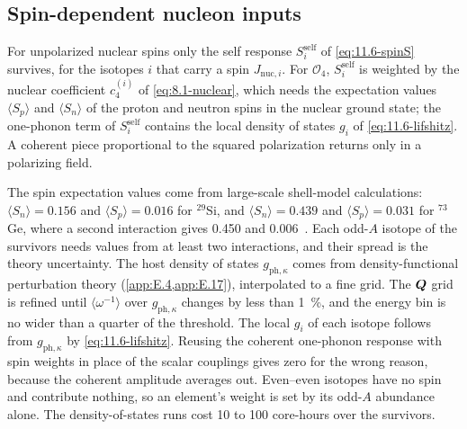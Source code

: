 \subsection{Spin-dependent nucleon inputs}

For unpolarized nuclear spins only the self response $S^{\mathrm{self}}_i$ of \cref{eq:11.6-spinS} survives, for the isotopes $i$ that carry a spin $J_{\mathrm{nuc},i}$. For $\mathcal{O}_4$, $S^{\mathrm{self}}_i$ is weighted by the nuclear coefficient $c_4^{(i)}$ of \cref{eq:8.1-nuclear}, which needs the expectation values $\langle S_p\rangle$ and $\langle S_n\rangle$ of the proton and neutron spins in the nuclear ground state; the one-phonon term of $S^{\mathrm{self}}_i$ contains the local density of states $g_i$ of \cref{eq:11.6-lifshitz}. A coherent piece proportional to the squared polarization returns only in a polarizing field.

The spin expectation values come from large-scale shell-model calculations: $\langle S_n\rangle = 0.156$ and $\langle S_p\rangle = 0.016$ for $^{29}$Si, and $\langle S_n\rangle = 0.439$ and $\langle S_p\rangle = 0.031$ for $^{73}$Ge, where a second interaction gives 0.450 and 0.006~\cite[Table~III]{klos2013large}. Each odd-$A$ isotope of the survivors needs values from at least two interactions, and their spread is the theory uncertainty. The host density of states $g_{\mathrm{ph},\kappa}$ comes from density-functional perturbation theory (\cref{app:E.4,app:E.17}), interpolated to a fine grid. The $\bm{Q}$ grid is refined until $\langle\omega^{-1}\rangle$ over $g_{\mathrm{ph},\kappa}$ changes by less than \SI{1}{\percent}, and the energy bin is no wider than a quarter of the threshold. The local $g_i$ of each isotope follows from $g_{\mathrm{ph},\kappa}$ by \cref{eq:11.6-lifshitz}. Reusing the coherent one-phonon response with spin weights in place of the scalar couplings gives zero for the wrong reason, because the coherent amplitude averages out. Even--even isotopes have no spin and contribute nothing, so an element's weight is set by its odd-$A$ abundance alone. The density-of-states runs cost 10 to 100 core-hours over the survivors.
